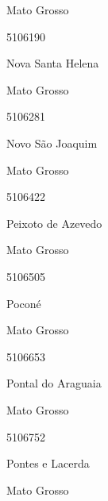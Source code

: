 \documentclass[
  letterpaper,
]{report}
\begin{document}
\n    

\n    

\n      

Mato Grosso

\n      

5106190

\n      

Nova Santa Helena

\n    

\n    

\n      

Mato Grosso

\n      

5106281

\n      

Novo São Joaquim

\n    

\n    

\n      

Mato Grosso

\n      

5106422

\n      

Peixoto de Azevedo

\n    

\n    

\n      

Mato Grosso

\n      

5106505

\n      

Poconé

\n    

\n    

\n      

Mato Grosso

\n      

5106653

\n      

Pontal do Araguaia

\n    

\n    

\n      

Mato Grosso

\n      

5106752

\n      

Pontes e Lacerda

\n    

\n    

\n      

Mato Grosso
\end{document}
